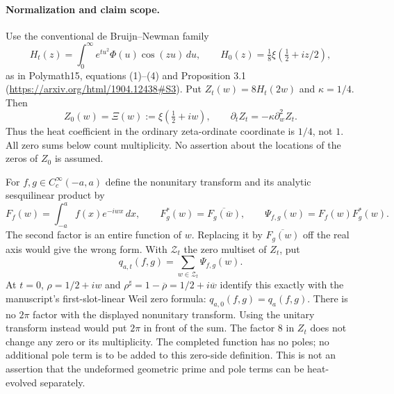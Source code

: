 \paragraph{Normalization and claim scope.}
Use the conventional de Bruijn--Newman family
\[
 H_t(z)=\int_0^\infty e^{tu^2}\Phi(u)\cos(zu)\,du,
 \qquad H_0(z)=\tfrac18\xi(\tfrac12+iz/2),
\]
as in Polymath15, equations (1)--(4) and Proposition 3.1
(\url{https://arxiv.org/html/1904.12438#S3}).
Put $Z_t(w)=8H_t(2w)$ and $\kappa=1/4$. Then
\begin{equation}\label{eq:ns52-normalization}
 Z_0(w)=\Xi(w):=\xi(\tfrac12+iw),\qquad
 \partial_t Z_t=-\kappa\partial_w^2 Z_t.
\end{equation}
Thus the heat coefficient in the ordinary zeta-ordinate coordinate is
$1/4$, not $1$. All zero sums below count multiplicity. No assertion
about the locations of the zeros of $Z_0$ is assumed.

For $f,g\in C_c^\infty(-a,a)$ define the nonunitary transform and
its analytic sesquilinear product by
\[
 F_f(w)=\int_{-a}^a f(x)e^{-iwx}\,dx,\qquad
 F_g^*(w)=\overline{F_g(\overline w)},\qquad
 \Psi_{f,g}(w)=F_f(w)F_g^*(w).
\]
The second factor is an entire function of $w$. Replacing it by
$\overline{F_g(w)}$ off the real axis would give the wrong form.
With $\mathcal Z_t$ the zero multiset of $Z_t$, put
\begin{equation}\label{eq:ns52-zero-form}
 q_{a,t}(f,g)=\sum_{w\in\mathcal Z_t}\Psi_{f,g}(w).
\end{equation}
At $t=0$, $\rho=1/2+iw$ and
$\rho^\sharp=1-\overline\rho=1/2+i\overline w$ identify this
exactly with the manuscript's first-slot-linear Weil zero formula:
$q_{a,0}(f,g)=q_a(f,g)$. There is no $2\pi$ factor with the
displayed nonunitary transform. Using the unitary transform instead
would put $2\pi$ in front of the sum. The factor $8$ in $Z_t$ does
not change any zero or its multiplicity. The completed function has
no poles; no additional pole term is to be added to this zero-side
definition. This is not an assertion that the undeformed geometric
prime and pole terms can be heat-evolved separately.

